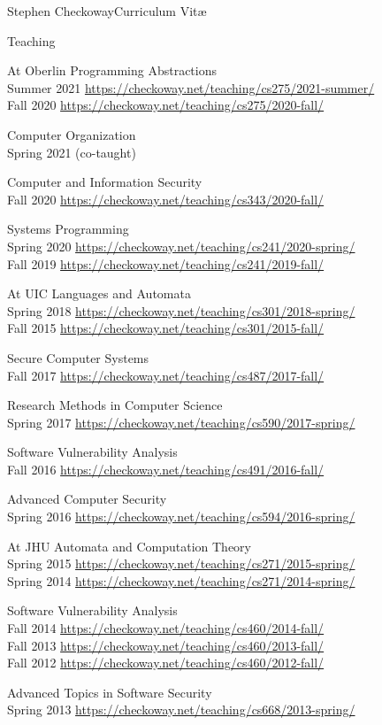 \documentclass[11pt,letterpaper]{article}
\newenvironment{cvseclist}[1]
	{\phantomsection
	\addcontentsline{toc}{section}{#1}%
	\begin{cvlist}{#1}}
	{\end{cvlist}}
\begin{document}
\begin{cv}{Stephen Checkoway\hfill Curriculum Vit\ae}
\newcommand\class{%
	\\
	\null
	\qquad
}
\begin{cvseclist}{Teaching}
	\item[At Oberlin] Programming Abstractions
		\class Summer 2021
		\url{https://checkoway.net/teaching/cs275/2021-summer/}
		\class Fall 2020
		\url{https://checkoway.net/teaching/cs275/2020-fall/}
	\item Computer Organization
		\class Spring 2021 (co-taught)
	\item Computer and Information Security
		\class Fall 2020
		\url{https://checkoway.net/teaching/cs343/2020-fall/}
	\item Systems Programming
		\class Spring 2020
		\url{https://checkoway.net/teaching/cs241/2020-spring/}
		\class Fall 2019
		\url{https://checkoway.net/teaching/cs241/2019-fall/}
	\item[At UIC] Languages and Automata
		\class Spring 2018
		\url{https://checkoway.net/teaching/cs301/2018-spring/}
		\class Fall 2015
		\url{https://checkoway.net/teaching/cs301/2015-fall/}
	\item Secure Computer Systems
		\class Fall 2017
		\url{https://checkoway.net/teaching/cs487/2017-fall/}
	\item Research Methods in Computer Science
		\class Spring 2017
		\url{https://checkoway.net/teaching/cs590/2017-spring/}
	\item Software Vulnerability Analysis
		\class Fall 2016
		\url{https://checkoway.net/teaching/cs491/2016-fall/}
	\item Advanced Computer Security
		\class Spring 2016
		\url{https://checkoway.net/teaching/cs594/2016-spring/}

	\item[At JHU] Automata and Computation Theory
		\class Spring 2015
		\url{https://checkoway.net/teaching/cs271/2015-spring/}
		\class Spring 2014
		\url{https://checkoway.net/teaching/cs271/2014-spring/}
	\item Software Vulnerability Analysis
		\class Fall 2014
		\url{https://checkoway.net/teaching/cs460/2014-fall/}
		\class Fall 2013
		\url{https://checkoway.net/teaching/cs460/2013-fall/}
		\class Fall 2012
		\url{https://checkoway.net/teaching/cs460/2012-fall/}
	\item Advanced Topics in Software Security
		\class Spring 2013
		\url{https://checkoway.net/teaching/cs668/2013-spring/}
\end{cvseclist}


\end{cv}
\end{document}
